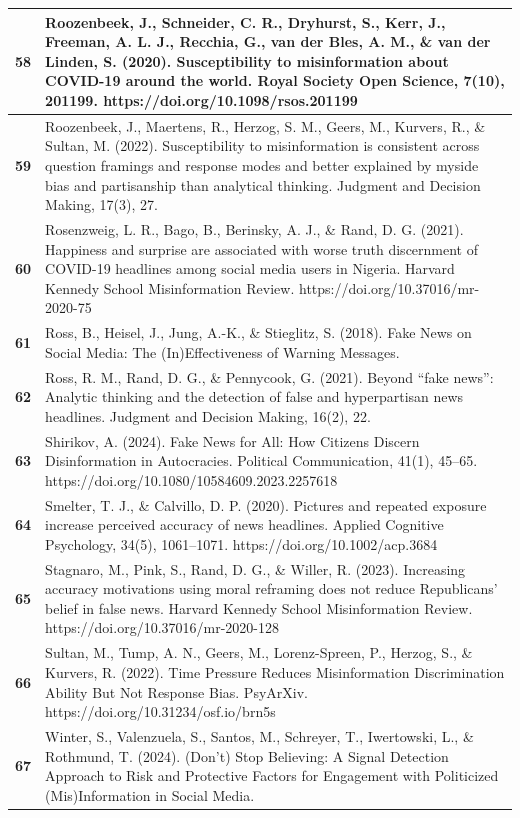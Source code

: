 \documentclass[
  doc,floatsintext]{apa6}
\begin{document}
\begin{longtable}[t]{>{}r||>{\raggedright\arraybackslash}p{30em}}
\hline
\textbf{58} & Roozenbeek, J., Schneider, C. R., Dryhurst, S., Kerr, J., Freeman, A. L. J., Recchia, G., van der Bles, A. M., \& van der Linden, S. (2020). Susceptibility to misinformation about COVID-19 around the world. Royal Society Open Science, 7(10), 201199. https://doi.org/10.1098/rsos.201199\\
\hline
\textbf{59} & Roozenbeek, J., Maertens, R., Herzog, S. M., Geers, M., Kurvers, R., \& Sultan, M. (2022). Susceptibility to misinformation is consistent across question framings and response modes and better explained by myside bias and partisanship than analytical thinking. Judgment and Decision Making, 17(3), 27.\\
\hline
\textbf{60} & Rosenzweig, L. R., Bago, B., Berinsky, A. J., \& Rand, D. G. (2021). Happiness and surprise are associated with worse truth discernment of COVID-19 headlines among social media users in Nigeria. Harvard Kennedy School Misinformation Review. https://doi.org/10.37016/mr-2020-75\\
\hline
\textbf{61} & Ross, B., Heisel, J., Jung, A.-K., \& Stieglitz, S. (2018). Fake News on Social Media: The (In)Effectiveness of Warning Messages.\\
\hline
\textbf{62} & Ross, R. M., Rand, D. G., \& Pennycook, G. (2021). Beyond “fake news”: Analytic thinking and the detection of false and hyperpartisan news headlines. Judgment and Decision Making, 16(2), 22.\\
\hline
\textbf{63} & Shirikov, A. (2024). Fake News for All: How Citizens Discern Disinformation in Autocracies. Political Communication, 41(1), 45–65. https://doi.org/10.1080/10584609.2023.2257618\\
\hline
\textbf{64} & Smelter, T. J., \& Calvillo, D. P. (2020). Pictures and repeated exposure increase perceived accuracy of news headlines. Applied Cognitive Psychology, 34(5), 1061–1071. https://doi.org/10.1002/acp.3684\\
\hline
\textbf{65} & Stagnaro, M., Pink, S., Rand, D. G., \& Willer, R. (2023). Increasing accuracy motivations using moral reframing does not reduce Republicans’ belief in false news. Harvard Kennedy School Misinformation Review. https://doi.org/10.37016/mr-2020-128\\
\hline
\textbf{66} & Sultan, M., Tump, A. N., Geers, M., Lorenz-Spreen, P., Herzog, S., \& Kurvers, R. (2022). Time Pressure Reduces Misinformation Discrimination Ability But Not Response Bias. PsyArXiv. https://doi.org/10.31234/osf.io/brn5s\\
\hline
\textbf{67} & Winter, S., Valenzuela, S., Santos, M., Schreyer, T., Iwertowski, L., \& Rothmund, T. (2024). (Don’t) Stop Believing: A Signal Detection Approach to Risk and Protective Factors for Engagement with Politicized (Mis)Information in Social Media.\\
\hline
\end{longtable}
\end{document}

